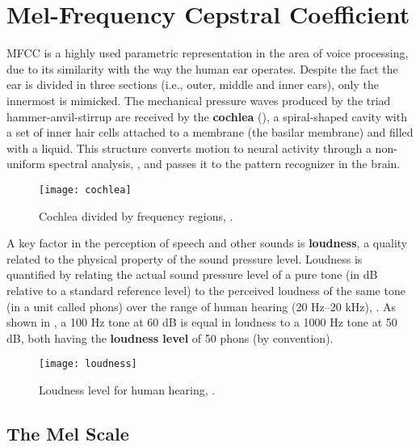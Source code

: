 \section{Mel-Frequency Cepstral Coefficient}

MFCC is a highly used parametric representation in the area of voice processing, due to its similarity with the way the human ear operates. Despite the fact the ear is divided in three sections (i.e., outer, middle and inner ears), only the innermost is mimicked. The mechanical pressure waves produced by the triad hammer-anvil-stirrup are received by the \textbf{cochlea} (), a spiral-shaped cavity with a set of inner hair cells attached to a membrane (the basilar membrane) and filled with a liquid. This structure converts motion to neural activity through a non-uniform spectral analysis, , and passes it to the pattern recognizer in the brain.

\begin{figure}[ht]
    \centering
    \texttt{[image: cochlea]}
    \caption{Cochlea divided by frequency regions, .}
    \label{fig:cochlea}
\end{figure}

A key factor in the perception of speech and other sounds is \textbf{loudness}, a quality related to the physical property of the sound pressure level. Loudness is quantified by relating the actual sound pressure level of a pure tone (in dB relative to a standard reference level) to the perceived loudness of the same tone (in a unit called phons) over the range of human hearing (20 Hz–20 kHz), . As shown in , a 100 Hz tone at 60 dB is equal in loudness to a 1000 Hz tone at 50 dB, both having the \textbf{loudness level} of 50 phons (by convention).

\begin{figure}[ht]
    \centering
    \texttt{[image: loudness]}
    \caption{Loudness level for human hearing, .}
    \label{fig:loudness}
\end{figure}

\subsection{The Mel Scale}

